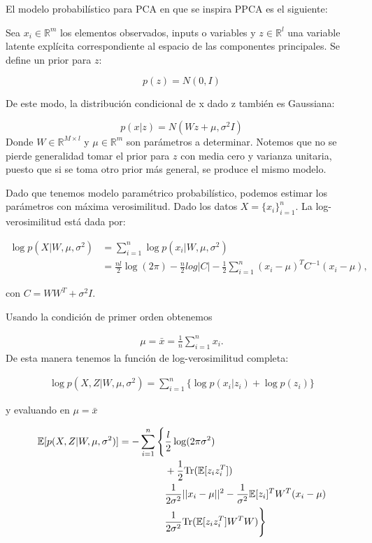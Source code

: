 El modelo probabilístico para PCA en que se inspira PPCA es el siguiente:

Sea $x_i\in \mathbb{R}^m$ los elementos observados, inputs o variables y $z\in \mathbb{R}^l$ una variable latente explícita correspondiente al espacio de las componentes principales. Se define un prior para $z$:

\begin{equation}
p(z) = N(0,I)
\end{equation}

De este modo, la distribución condicional de x dado z también es Gaussiana:

\begin{equation}
p(x|z) = N(Wz+\mu,\sigma^2I)
\end{equation}
Donde $W\in \mathbb{R}^{M\times l}$ y $\mu \in \mathbb{R}^m$ son parámetros a determinar. Notemos que no se pierde generalidad tomar el prior para $z$ con media cero y varianza unitaria, puesto que si se toma otro prior más general, se produce el mismo modelo.

Dado que tenemos modelo paramétrico probabilístico, podemos estimar los parámetros con máxima verosimilitud. Dado los datos $X = \{x_i\}_{i=1}^n$. La log-verosimilitud está dada por:

\begin{align}
\log p(X|W,\mu, \sigma^2) & = \sum_{i=1}^n \log p(x_i|W,\mu, \sigma^2)\\
& = \frac{n l}{2}\log (2\pi) - \frac{n}{2}log|C| - \frac{1}{2}\sum_{i=1}^n (x_i-\mu)^T C^{-1} (x_i-\mu),
\end{align}

con $C = WW^T + \sigma^2 I$.

Usando la condición de primer orden obtenemos

\begin{align}
\mu = \bar{x} = \frac{1}{n}\sum_{i=1}^n x_i.
\end{align}
De esta manera tenemos la función de log-verosimilitud completa:

\begin{align}
    \log p(X, Z|W, \mu, \sigma^2) = \sum_{i=1}^n \{\log p(x_i|z_i) + \log p(z_i)\}
\end{align}

y evaluando en $\mu = \bar{x}$

\begin{align}
\notag \mathbb{E}[ p(X,Z |W, \mu, \sigma^2) ] =  -\sum_{i=1}^n \Bigg\{ &\frac{l}{2} \log (2\pi \sigma^2)\\
\notag & + \frac{1}{2}\text{Tr}(\mathbb{E}[z_iz_i^T])\\
\notag & \frac{1}{2\sigma^2}||x_i - \mu||^2 - \frac{1}{\sigma^2}\mathbb{E}[z_i]^T W^T (x_i - \mu)\\
& \frac{1}{2\sigma^2} \text{Tr}(\mathbb{E}[z_iz_i^T]W^T W) \Bigg\}
\end{align}

